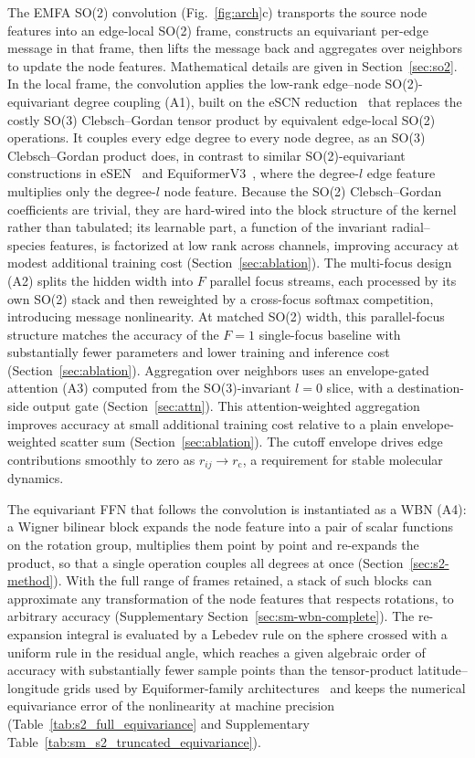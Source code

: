 The EMFA SO(2) convolution (Fig.~\ref{fig:arch}c) transports the source node features into an edge-local SO(2) frame, constructs an equivariant per-edge message in that frame, then lifts the message back and aggregates over neighbors to update the node features.
Mathematical details are given in Section~\ref{sec:so2}.
In the local frame, the convolution applies the low-rank edge--node SO(2)-equivariant degree coupling (A1), built on the eSCN reduction~\cite{passaro2023reducing} that replaces the costly SO(3) Clebsch--Gordan tensor product by equivalent edge-local SO(2) operations.
It couples every edge degree to every node degree, as an SO(3) Clebsch--Gordan product does, in contrast to similar SO(2)-equivariant constructions in eSEN~\cite{fu2025esen} and EquiformerV3~\cite{liao2026equiformerv3}, where the degree-$l$ edge feature multiplies only the degree-$l$ node feature.
Because the SO(2) Clebsch--Gordan coefficients are trivial, they are hard-wired into the block structure of the kernel rather than tabulated; its learnable part, a function of the invariant radial--species features, is factorized at low rank across channels, improving accuracy at modest additional training cost (Section~\ref{sec:ablation}).
The multi-focus design (A2) splits the hidden width into $F$ parallel focus streams, each processed by its own SO(2) stack and then reweighted by a cross-focus softmax competition, introducing message nonlinearity.
At matched SO(2) width, this parallel-focus structure matches the accuracy of the $F=1$ single-focus baseline with substantially fewer parameters and lower training and inference cost (Section~\ref{sec:ablation}).
Aggregation over neighbors uses an envelope-gated attention (A3) computed from the SO(3)-invariant $l=0$ slice, with a destination-side output gate (Section~\ref{sec:attn}).
This attention-weighted aggregation improves accuracy at small additional training cost relative to a plain envelope-weighted scatter sum (Section~\ref{sec:ablation}).
The cutoff envelope drives edge contributions smoothly to zero as $r_{ij}\to r_{\mathrm{c}}$, a requirement for stable molecular dynamics.

The equivariant FFN that follows the convolution is instantiated as a WBN (A4): a Wigner bilinear block expands the node feature into a pair of scalar functions on the rotation group, multiplies them point by point and re-expands the product, so that a single operation couples all degrees at once (Section~\ref{sec:s2-method}).
With the full range of frames retained, a stack of such blocks can approximate any transformation of the node features that respects rotations, to arbitrary accuracy (Supplementary Section~\ref{sec:sm-wbn-complete}).
The re-expansion integral is evaluated by a Lebedev rule on the sphere crossed with a uniform rule in the residual angle, which reaches a given algebraic order of accuracy with substantially fewer sample points than the tensor-product latitude--longitude grids used by Equiformer-family architectures~\cite{liao2023equiformerv2,liao2026equiformerv3} and keeps the numerical equivariance error of the nonlinearity at machine precision (Table~\ref{tab:s2_full_equivariance} and Supplementary Table~\ref{tab:sm_s2_truncated_equivariance}).

